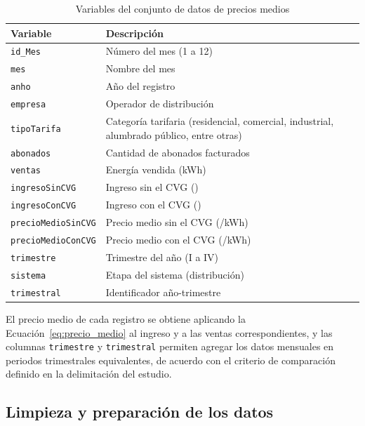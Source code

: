 \documentclass[conference]{IEEEtran}
\newcommand{\crc}{\textcolonmonetary} %
\begin{document}
\begin{table}[htbp]
\caption{Variables del conjunto de datos de precios medios}
\label{tab:variables}
\centering
\scriptsize
\renewcommand{\arraystretch}{1.15}
\begin{tabular}{@{}>{\raggedright\arraybackslash}p{2.8cm} p{5.2cm}@{}}
\hline
\textbf{Variable} & \textbf{Descripci\'on} \\
\hline
\texttt{id\_Mes} & N\'umero del mes (1 a 12) \\
\texttt{mes} & Nombre del mes \\
\texttt{anho} & A\~no del registro \\
\texttt{empresa} & Operador de distribuci\'on \\
\texttt{tipoTarifa} & Categor\'ia tarifaria (residencial, comercial, industrial, alumbrado p\'ublico, entre otras) \\
\texttt{abonados} & Cantidad de abonados facturados \\
\texttt{ventas} & Energ\'ia vendida (kWh) \\
\texttt{ingreso\-Sin\-CVG} & Ingreso sin el CVG (\crc) \\
\texttt{ingreso\-Con\-CVG} & Ingreso con el CVG (\crc) \\
\texttt{precio\-Medio\-Sin\-CVG} & Precio medio sin el CVG (\crc/kWh) \\
\texttt{precio\-Medio\-Con\-CVG} & Precio medio con el CVG (\crc/kWh) \\
\texttt{trimestre} & Trimestre del a\~no (I a IV) \\
\texttt{sistema} & Etapa del sistema (distribuci\'on) \\
\texttt{trimestral} & Identificador a\~no-trimestre \\
\hline
\end{tabular}
\end{table}
\FloatBarrier

El precio medio de cada registro se obtiene aplicando la Ecuaci\'on~\eqref{eq:precio_medio} al ingreso y a las ventas correspondientes, y las columnas \texttt{trimestre} y \texttt{trimestral} permiten agregar los datos mensuales en periodos trimestrales equivalentes, de acuerdo con el criterio de comparaci\'on definido en la delimitaci\'on del estudio.


\subsection{Limpieza y preparaci\'on de los datos}
\label{sec:limpieza}
\end{document}
